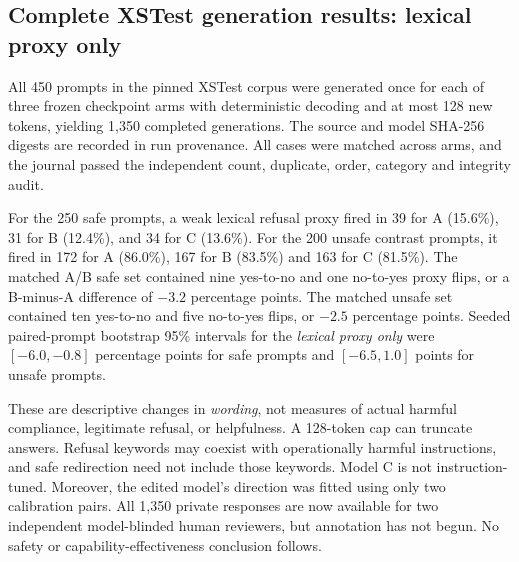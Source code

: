 \documentclass[11pt]{article}
\begin{document}
\subsection{Complete XSTest generation results: lexical proxy only}
All 450 prompts in the pinned XSTest corpus were generated once
for each of three frozen checkpoint arms with deterministic decoding
and at most 128 new tokens, yielding 1,350 completed generations.
The source and model SHA-256 digests are recorded in run provenance.
All cases were matched across arms, and the journal passed the
independent count, duplicate, order, category and integrity audit.

For the 250 safe prompts, a weak lexical refusal proxy fired in
39 for A (15.6\%), 31 for B (12.4\%), and 34 for C (13.6\%).
For the 200 unsafe contrast prompts, it fired in 172 for A
(86.0\%), 167 for B (83.5\%) and 163 for C (81.5\%).
The matched A/B safe set contained nine yes-to-no and one
no-to-yes proxy flips, or a B-minus-A difference of $-3.2$
percentage points. The matched unsafe set contained ten
yes-to-no and five no-to-yes flips, or $-2.5$ percentage points.
Seeded paired-prompt bootstrap 95\% intervals for the
\emph{lexical proxy only} were $[-6.0,-0.8]$ percentage points
for safe prompts and $[-6.5,1.0]$ points for unsafe prompts.

These are descriptive changes in \emph{wording}, not measures
of actual harmful compliance, legitimate refusal, or helpfulness.
A 128-token cap can truncate answers. Refusal keywords may
coexist with operationally harmful instructions, and safe
redirection need not include those keywords. Model C is not
instruction-tuned. Moreover, the edited model's direction
was fitted using only two calibration pairs. All 1,350
private responses are now available for two independent
model-blinded human reviewers, but annotation has not begun.
No safety or capability-effectiveness conclusion follows.
\end{document}
